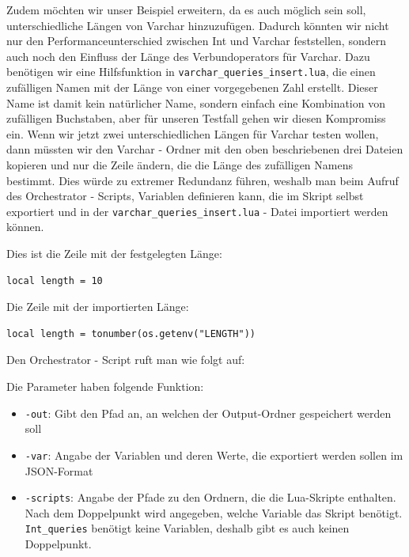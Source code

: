 Zudem möchten wir unser Beispiel erweitern, da es auch möglich sein soll, unterschiedliche Längen von Varchar hinzuzufügen.
Dadurch könnten wir nicht nur den Performanceunterschied zwischen Int und Varchar feststellen, sondern auch noch den Einfluss der Länge des Verbundoperators für Varchar.
Dazu benötigen wir eine Hilfsfunktion in \texttt{varchar\_queries\_insert.lua}, die einen zufälligen Namen mit der Länge von einer vorgegebenen Zahl erstellt.
Dieser Name ist damit kein natürlicher Name, sondern einfach eine Kombination von zufälligen Buchstaben, aber für unseren Testfall gehen wir diesen Kompromiss ein.
Wenn wir jetzt zwei unterschiedlichen Längen für Varchar testen wollen, dann müssten wir den Varchar - Ordner mit den oben beschriebenen drei Dateien kopieren und nur die Zeile ändern, die die Länge des zufälligen Namens bestimmt.
Dies würde zu extremer Redundanz führen, weshalb man beim Aufruf des Orchestrator - Scripts, Variablen definieren kann, die im Skript selbst exportiert und in der \texttt{varchar\_queries\_insert.lua} - Datei importiert werden können.

Dies ist die Zeile mit der festgelegten Länge:
\begin{lstlisting}[language={[5.0]Lua},label={lst:without_imported_length,style=custom_daniel}]
local length = 10
\end{lstlisting}

Die Zeile mit der importierten Länge:
\begin{lstlisting}[language={[5.0]Lua},label={lst:with_imported_length,style=custom_daniel}]
local length = tonumber(os.getenv("LENGTH"))
\end{lstlisting}

Den Orchestrator - Script ruft man wie folgt auf:


Die Parameter haben folgende Funktion:
\begin{itemize}[label=--]
    \item \texttt{-out}: Gibt den Pfad an, an welchen der Output-Ordner gespeichert werden soll
    \item \texttt{-var}: Angabe der Variablen und deren Werte, die exportiert werden sollen im JSON-Format
    \item \texttt{-scripts}: Angabe der Pfade zu den Ordnern, die die Lua-Skripte enthalten.
    Nach dem Doppelpunkt wird angegeben, welche Variable das Skript benötigt. \texttt{Int\_queries} benötigt keine Variablen, deshalb gibt es auch keinen Doppelpunkt.
\end{itemize}

